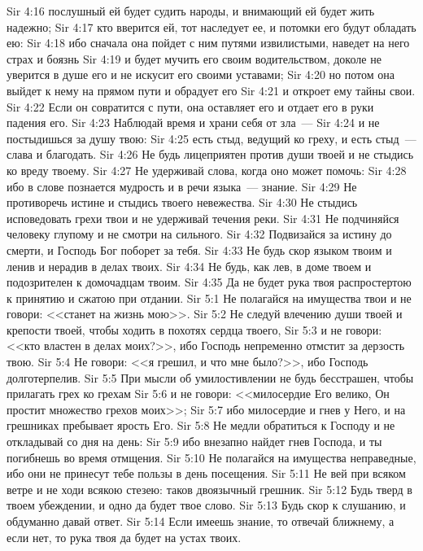\vs Sir 4:16 послушный ей будет судить народы, и внимающий ей будет жить надежно;
\vs Sir 4:17 кто вверится ей, тот наследует ее, и потомки его будут обладать ею:
\vs Sir 4:18 ибо сначала она пойдет с ним путями извилистыми, наведет на него страх и боязнь
\vs Sir 4:19 и будет мучить его своим водительством, доколе не уверится в душе его и не искусит его своими уставами;
\vs Sir 4:20 но потом она выйдет к нему на прямом пути и обрадует его
\vs Sir 4:21 и откроет ему тайны свои.
\vs Sir 4:22 Если он совратится с пути, она оставляет его и отдает его в руки падения его.
\rsbpar\vs Sir 4:23 Наблюдай время и храни себя от зла~---
\vs Sir 4:24 и не постыдишься за душу твою:
\vs Sir 4:25 есть стыд, ведущий ко греху, и есть стыд~--- слава и благодать.
\vs Sir 4:26 Не будь лицеприятен против души твоей и не стыдись ко вреду твоему.
\vs Sir 4:27 Не удерживай слова, когда оно может помочь:
\vs Sir 4:28 ибо в слове познается мудрость и в речи языка~--- знание.
\vs Sir 4:29 Не противоречь истине и стыдись твоего невежества.
\vs Sir 4:30 Не стыдись исповедовать грехи твои и не удерживай течения реки.
\vs Sir 4:31 Не подчиняйся человеку глупому и не смотри на сильного.
\vs Sir 4:32 Подвизайся за истину до смерти, и Господь Бог поборет за тебя.
\vs Sir 4:33 Не будь скор языком твоим и ленив и нерадив в делах твоих.
\vs Sir 4:34 Не будь, как лев, в доме твоем и подозрителен к домочадцам твоим.
\vs Sir 4:35 Да не будет рука твоя распростертою к принятию и сжатою при отдании.
\vs Sir 5:1 Не полагайся на имущества твои и не говори: <<станет на жизнь мою>>.
\vs Sir 5:2 Не следуй влечению души твоей и крепости твоей, чтобы ходить в похотях сердца твоего,
\vs Sir 5:3 и не говори: <<кто властен в делах моих?>>, ибо Господь непременно отмстит за дерзость твою.
\vs Sir 5:4 Не говори: <<я грешил, и что мне было?>>, ибо Господь долготерпелив.
\vs Sir 5:5 При мысли об умилостивлении не будь бесстрашен, чтобы прилагать грех ко грехам
\vs Sir 5:6 и не говори: <<милосердие Его велико, Он простит множество грехов моих>>;
\vs Sir 5:7 ибо милосердие и гнев у Него, и на грешниках пребывает ярость Его.
\vs Sir 5:8 Не медли обратиться к Господу и не откладывай со дня на день:
\vs Sir 5:9 ибо внезапно найдет гнев Господа, и ты погибнешь во время отмщения.
\vs Sir 5:10 Не полагайся на имущества неправедные, ибо они не принесут тебе пользы в день посещения.
\vs Sir 5:11 Не вей при всяком ветре и не ходи всякою стезею: таков двоязычный грешник.
\vs Sir 5:12 Будь тверд в твоем убеждении, и одно да будет твое слово.
\vs Sir 5:13 Будь скор к слушанию, и обдуманно давай ответ.
\vs Sir 5:14 Если имеешь знание, то отвечай ближнему, а если нет, то рука твоя да будет на устах твоих.
